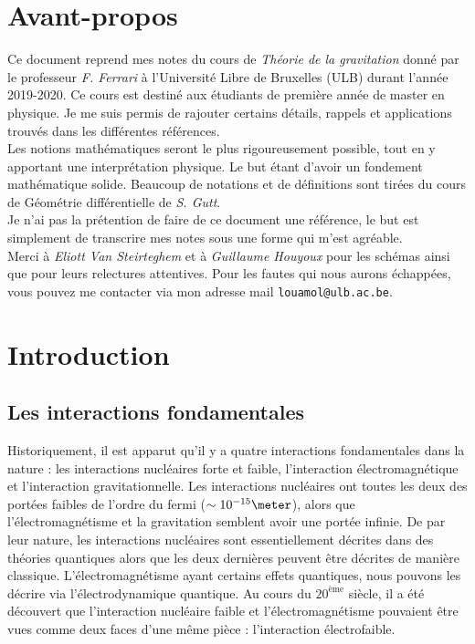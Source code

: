 \documentclass[a4paper,11pt]{report}
\theoremstyle{definition}
\theoremstyle{plain}
\theoremstyle{definition}
\theoremstyle{remark}
\begin{document}
\nocite{weinberg}
\nocite{wheeler}
\nocite{hawking}
\nocite{hartle}
\nocite{price}
\nocite{nakahara}
\nocite{wald}
\nocite{lee}
\nocite{gutt}

\chapter*{Avant-propos}

    Ce document reprend mes notes du cours de \textit{Théorie de la gravitation} donné par le professeur \textit{F. Ferrari} à l'Université Libre de Bruxelles (ULB) durant l'année 2019-2020. Ce cours est destiné aux étudiants de première année de master en physique. Je me suis permis de rajouter certains détails, rappels et applications trouvés dans les différentes références.\\
    
    Les notions mathématiques seront le plus rigoureusement possible, tout en y apportant une interprétation physique. Le but étant d'avoir un fondement mathématique solide. Beaucoup de notations et de définitions sont tirées du cours de Géométrie différentielle de \textit{S. Gutt}. \\
    
    Je n'ai pas la prétention de faire de ce document une référence, le but est simplement de transcrire mes notes sous une forme qui m'est agréable.\\
    
    Merci à \textit{Eliott Van Steirteghem} et à \textit{Guillaume Houyoux} pour les schémas ainsi que pour leurs relectures attentives. Pour les fautes qui nous aurons échappées, vous pouvez me contacter via mon adresse mail \verb?louamol@ulb.ac.be?.

\printbibliography[title=Références]
\pagebreak
\tableofcontents
\pagebreak

\chapter{Introduction}

    \section{Les interactions fondamentales}
    
        Historiquement, il est apparut qu'il y a quatre interactions fondamentales dans la nature : les interactions nucléaires forte et faible, l'interaction électromagnétique et l'interaction gravitationnelle. Les interactions nucléaires ont toutes les deux des portées faibles de l'ordre du fermi ($\sim10^{-15}\meter$), alors que  l'électromagnétisme et la gravitation semblent avoir une portée infinie. De par leur nature, les interactions nucléaires sont essentiellement décrites dans des théories quantiques alors que les deux dernières peuvent être décrites de manière classique. L'électromagnétisme ayant certains effets quantiques, nous pouvons les décrire via l'électrodynamique quantique. Au cours du $20^{\text{ème}}$ siècle, il a été découvert que l'interaction nucléaire faible et l'électromagnétisme pouvaient être vues comme deux faces d'une même pièce : l'interaction électrofaible.\\
        
\end{document}
